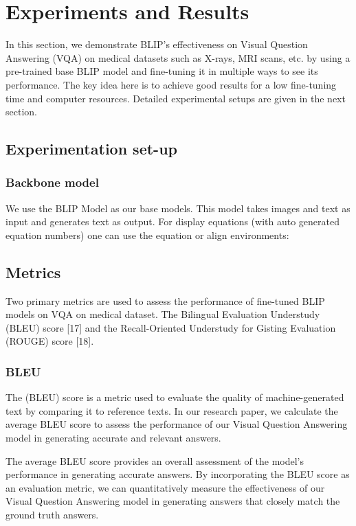 \documentclass[pdflatex,sn-mathphys-num]{sn-jnl}%
\begin{document}
\section{Experiments and Results}\label{sec4}

In this section, we demonstrate BLIP’s effectiveness on Visual Question Answering (VQA) on medical datasets such as X-rays, MRI scans, etc. by using a pre-trained base BLIP model and fine-tuning it in multiple ways to see its performance. The key idea here is to achieve good results for a low fine-tuning time and computer resources. Detailed experimental setups are given in the next section. 

\subsection{Experimentation set-up}\label{subsec4.1}

\subsubsection{Backbone model}\label{subsubsec4.1.1}
We use the BLIP Model as our base models. This model takes images and text as input and generates text as output. 
For display equations (with auto generated equation numbers)
one can use the equation or align environments:

\subsection{Metrics}\label{subsec4.2}
Two primary metrics are used to assess the performance of fine-tuned BLIP models on VQA on medical dataset. The Bilingual Evaluation Understudy (BLEU) score [17] and the Recall-Oriented Understudy for Gisting Evaluation (ROUGE) score [18]. 

\subsubsection{BLEU}\label{subsubsec4.2.1}
The (BLEU) score is a metric used to evaluate the quality of machine-generated text by comparing it to reference texts. In our research paper, we calculate the average BLEU score to assess the performance of our Visual Question Answering model in generating accurate and relevant answers.

The average BLEU score provides an overall assessment of the model's performance in generating accurate answers. By incorporating the BLEU score as an evaluation metric, we can quantitatively measure the effectiveness of our Visual Question Answering model in generating answers that closely match the ground truth answers.
\end{document}
